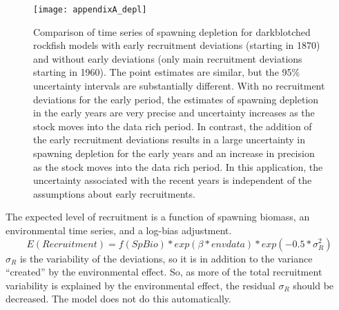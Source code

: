 \begin{figure}[H]
	\begin{center}
		\texttt{[image: appendixA\_depl]}\\
	\end{center}
	\caption{Comparison of time series of spawning depletion for darkblotched rockfish models with early recruitment deviations (starting in 1870) and without early deviations (only main recruitment deviations starting in 1960). The point estimates are similar, but the 95\% uncertainty intervals are substantially different. With no recruitment deviations for the early period, the estimates of spawning depletion in the early years are very precise and uncertainty increases as the stock moves into the data rich period. In contrast, the addition of the early recruitment deviations results in a large uncertainty in spawning depletion for the early years and an increase in precision as the stock moves into the data rich period. In this application, the uncertainty associated with the recent years is independent of the assumptions about early recruitments.}
	\label{fig:depl}
\end{figure}

The expected level of recruitment is a function of spawning biomass, an environmental time series, and a log-bias adjustment.
\begin{equation}
	E(Recruitment) = f(SpBio) * exp(\beta*envdata) * exp(-0.5*\sigma_R^2)
\end{equation}
$\sigma_R$ is the variability of the deviations, so it is in addition to the variance ``created'' by the environmental effect.  So, as more of the total recruitment variability is explained by the environmental effect, the residual $\sigma_R$ should be decreased.  The model does not do this automatically.

